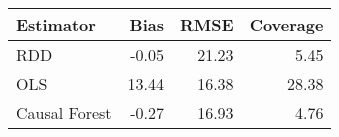 \begin{table}[ht]
\centering
\begin{tabular}{lrrr}
  \hline
Estimator & Bias & RMSE & Coverage \\ 
  \hline
RDD & -0.05 & 21.23 & 5.45 \\ 
  OLS & 13.44 & 16.38 & 28.38 \\ 
  Causal Forest & -0.27 & 16.93 & 4.76 \\ 
   \hline
\end{tabular}
\end{table}
